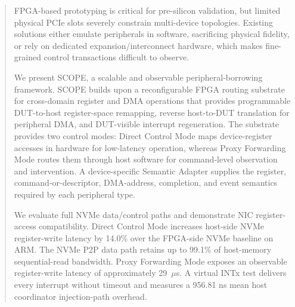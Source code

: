 \documentclass[10pt,conference,letterpaper]{IEEEtran}
\begin{document}
\author{
\and
{}
\and
{}
}




\maketitle

\begin{abstract}
FPGA-based prototyping is critical for pre-silicon validation, but limited physical PCIe slots severely constrain multi-device topologies. Existing solutions either emulate peripherals in software, sacrificing physical fidelity, or rely on dedicated expansion/interconnect hardware, which makes fine-grained control transactions difficult to observe.

We present SCOPE, a scalable and observable peripheral-borrowing framework. SCOPE builds upon a reconfigurable FPGA routing substrate for cross-domain register and DMA operations that provides programmable DUT-to-host register-space remapping, reverse host-to-DUT translation for peripheral DMA, and DUT-visible interrupt regeneration. The substrate provides two control modes: Direct Control Mode maps device-register accesses in hardware for low-latency operation, whereas Proxy Forwarding Mode routes them through host software for command-level observation and intervention. A device-specific Semantic Adapter supplies the register, command-or-descriptor, DMA-address, completion, and event semantics required by each peripheral type.

We evaluate full NVMe data/control paths and demonstrate NIC register-access compatibility. Direct Control Mode increases host-side NVMe register-write latency by 14.0\% over the FPGA-side NVMe baseline on ARM. The NVMe P2P data path retains up to 99.1\% of host-memory sequential-read bandwidth. Proxy Forwarding Mode exposes an observable register-write latency of approximately 29~$\mu$s. A virtual INTx test delivers every interrupt without timeout and measures a 956.81 ns mean host coordinator injection-path overhead. 
\end{abstract}
\end{document}
